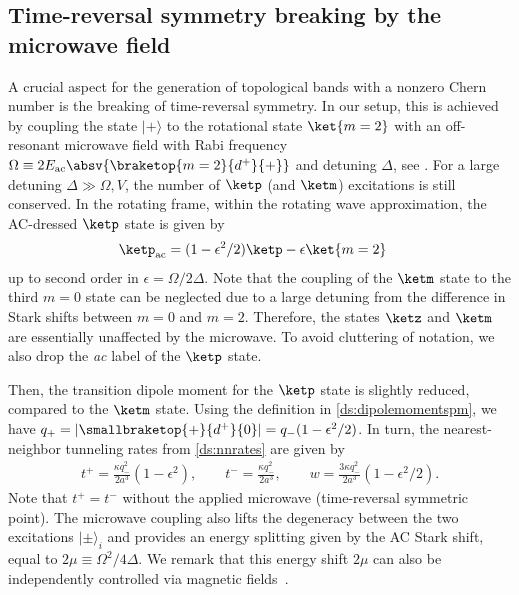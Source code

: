 \subsection{Time-reversal symmetry breaking by the microwave field}
A crucial aspect for the generation of topological bands with a nonzero Chern number is the breaking of time-reversal symmetry.
In our setup, this is achieved by coupling the state $|+\rangle$ to the rotational state $\ket{m=2}$ with an off-resonant microwave field with Rabi frequency $\Omega \equiv 2 E_\text{ac} \absv{\braketop{m=2}{d^+}{{+}}}$ and detuning $\Delta$, see .
For a large detuning $\Delta \gg \Omega, V$, the number of $\ketp$ (and $\ketm$) excitations is still conserved.
In the rotating frame, within the rotating wave approximation, the AC-dressed $\ketp$ state is given by
\begin{align}
\ketp_\text{ac} &= (1-\epsilon^2/2)\ketp - \epsilon \ket{m=2}
\end{align}
up to second order in $\epsilon=\Omega/2\Delta$.
Note that the coupling of the $\ketm$ state to the third $m=0$ state can be neglected due to a large detuning from the difference in Stark shifts between $m=0$ and $m=2$.
Therefore, the states $\ketz$ and $\ketm$ are essentially unaffected by the microwave.
To avoid cluttering of notation, we also drop the \emph{ac} label of the $\ketp$ state.

Then, the transition dipole moment for the $\ketp$ state is slightly reduced, compared to the $\ketm$ state. Using the definition in \cref{ds:dipolemomentspm}, we have $q_+ = |\smallbraketop{+}{d^+}{0}|= q_- (1-\epsilon^2/2)$. In turn, the nearest-neighbor tunneling rates from \cref{ds:nnrates} are given by
\begin{align}
    t^+ = \frac{\kappa q_{-}^2}{2a^3} (1 - \epsilon^2),\qquad
    t^- = \frac{\kappa q_{-}^2}{2a^3},\qquad
    w = \frac{3 \kappa q_{-}^2}{2a^3} (1-\epsilon^2/2).
\end{align}
Note that $t^{+} = t^{-}$ without the applied microwave (time-reversal symmetric point).
The microwave coupling also lifts the degeneracy between the two excitations $|\pm\rangle_{i}$ and provides an energy splitting given by the AC Stark shift, equal to $2\mu \equiv \Omega^2/4\Delta$.
We remark that this energy shift $2\mu$ can also be independently controlled via magnetic fields~\cite{Ospelkaus2010,Yan2013}.

